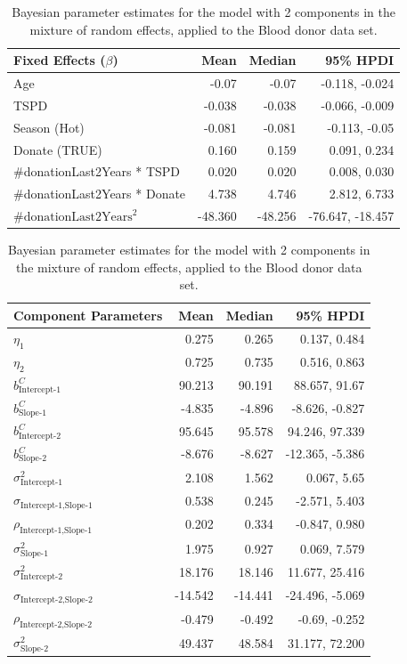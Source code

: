 \begin{table}[htb]
\centering
\captionsetup{justification=centering}
\caption{Bayesian parameter estimates for the model with 2 components in the mixture of random effects, applied to the Blood donor data set.}
\label{table : bhtge_blooddonor_2comp}
\begin{tabular}{@{}lrrr@{}}
\toprule
Fixed Effects ($\beta$) & Mean & Median & 95\% HPDI \\ \midrule
Age &  -0.07 & -0.07 & -0.118, -0.024\\
TSPD & -0.038 & -0.038 & -0.066, -0.009\\
Season (Hot) & -0.081 & -0.081 & -0.113, -0.05\\
Donate (TRUE) & 0.160 & 0.159 & 0.091, 0.234\\
\#donationLast2Years * TSPD & 0.020 & 0.020 & 0.008, 0.030\\
\#donationLast2Years * Donate & 4.738 & 4.746 & 2.812, 6.733\\
$\text{\#donationLast2Years}^2$  & -48.360 & -48.256 & -76.647, -18.457\\ \bottomrule
\end{tabular}

\begin{tabular}{@{}lrrr@{}}
\toprule
Component Parameters & Mean & Median & 95\% HPDI \\ \midrule
$\eta_1$ & 0.275 & 0.265 & 0.137, 0.484\\
$\eta_2$ & 0.725 & 0.735 & 0.516, 0.863\\

$b_\text{Intercept-1}^C$ & 90.213 & 90.191 & 88.657, 91.67\\
$b_\text{Slope-1}^C$ & -4.835 & -4.896 & -8.626, -0.827\\

$b_\text{Intercept-2}^C$ & 95.645 & 95.578 & 94.246, 97.339\\
$b_\text{Slope-2}^C$ & -8.676 & -8.627 & -12.365, -5.386\\

$\sigma^2_\text{Intercept-1}$ & 2.108 & 1.562 & 0.067, 5.65\\
$\sigma_{\text{Intercept-1}, \text{Slope-1}}$ & 0.538 & 0.245 & -2.571, 5.403\\
$\rho_{\text{Intercept-1}, \text{Slope-1}}$ & 0.202 & 0.334 & -0.847, 0.980\\
$\sigma^2_\text{Slope-1}$ & 1.975 & 0.927 & 0.069, 7.579\\

$\sigma^2_\text{Intercept-2}$ & 18.176 & 18.146 & 11.677, 25.416\\
$\sigma_{\text{Intercept-2}, \text{Slope-2}}$ & -14.542 & -14.441 & -24.496, -5.069\\
$\rho_{\text{Intercept-2}, \text{Slope-2}}$ & -0.479 & -0.492 & -0.69, -0.252\\
$\sigma^2_\text{Slope-2}$ & 49.437 & 48.584 & 31.177, 72.200\\ \bottomrule
\end{tabular}


\end{table}
